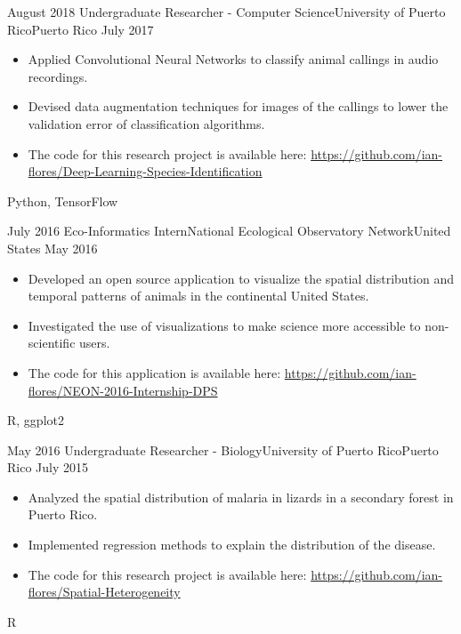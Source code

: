\begin{experiences}
  \experience
    {August 2018}   {Undergraduate Researcher - Computer Science}{University of Puerto Rico}{Puerto Rico}
    {July 2017} {
                      \begin{itemize}
                        \item Applied Convolutional Neural Networks to classify animal callings in audio recordings.    
                        \item Devised data augmentation techniques for images of the callings to lower the validation \newline error of classification algorithms.
                        \item The code for this research project is available here: \newline
                        \href{https://github.com/ian-flores/Deep-Learning-Species-Identification}{https://github.com/ian-flores/Deep-Learning-Species-Identification}
                      \end{itemize}
                    }
                    {Python, TensorFlow}
  \emptySeparator
  
  \experience
    {July 2016}   {Eco-Informatics Intern}{National Ecological Observatory Network}{United States}
    {May 2016} {
                      \begin{itemize}
                        \item Developed an open source application to visualize the spatial distribution and temporal patterns of animals in the continental United States.
                        \item Investigated the use of visualizations to make science more accessible to non-scientific users.
                        \item The code for this application is available here: \newline
                        \href{https://github.com/ian-flores/NEON-2016-Internship-DPS}{https://github.com/ian-flores/NEON-2016-Internship-DPS}
                      \end{itemize}
                    }
                    {R, ggplot2}
  \emptySeparator
  
  \experience
    {May 2016}   {Undergraduate Researcher - Biology}{University of Puerto Rico}{Puerto Rico}
    {July 2015} {
                      \begin{itemize}
                        \item Analyzed the spatial distribution of malaria in lizards in a secondary forest in Puerto Rico.
                        \item Implemented regression methods to explain the distribution of the disease.
                        \item The code for this research project is available here: \newline
                        \href{https://github.com/ian-flores/Spatial-Heterogeneity}{https://github.com/ian-flores/Spatial-Heterogeneity}
                      \end{itemize}
                    }
                    {R}
  \emptySeparator
  
\end{experiences}
